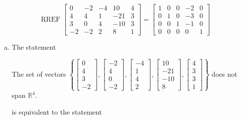 \begin{exerciseAnswer} 


\[\operatorname{RREF} \left[\begin{array}{ccccc}
0 & -2 & -4 & 10 & 4 \\
4 & 4 & 1 & -21 & 3 \\
3 & 0 & 4 & -10 & 3 \\
-2 & -2 & 2 & 8 & 1
\end{array}\right] = \left[\begin{array}{ccccc}
1 & 0 & 0 & -2 & 0 \\
0 & 1 & 0 & -3 & 0 \\
0 & 0 & 1 & -1 & 0 \\
0 & 0 & 0 & 0 & 1
\end{array}\right] \]


\begin{enumerate}[(a)]
\item The statement 
\begin{center}\begin{minipage}{0.8\textwidth}
 The set of vectors \( \left\{ \left[\begin{array}{c}
0 \\
4 \\
3 \\
-2
\end{array}\right] , \left[\begin{array}{c}
-2 \\
4 \\
0 \\
-2
\end{array}\right] , \left[\begin{array}{c}
-4 \\
1 \\
4 \\
2
\end{array}\right] , \left[\begin{array}{c}
10 \\
-21 \\
-10 \\
8
\end{array}\right] , \left[\begin{array}{c}
4 \\
3 \\
3 \\
1
\end{array}\right] \right\} \) does not span \(\mathbb{R}^4\). 
\end{minipage}\end{center}
     is equivalent to the statement 

\end{enumerate}
\end{exerciseAnswer}
